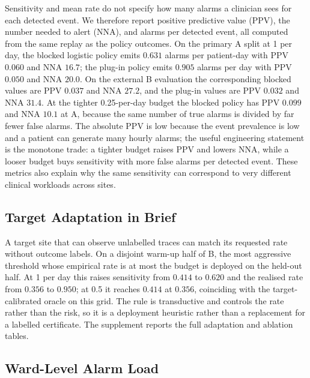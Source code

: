 Sensitivity and mean rate do not specify how many alarms a clinician sees for each detected event. We therefore report positive predictive value (PPV), the number needed to alert (NNA), and alarms per detected event, all computed from the same replay as the policy outcomes. On the primary A split at 1 per day, the blocked logistic policy emits $0.631$ alarms per patient-day with PPV $0.060$ and NNA $16.7$; the plug-in policy emits $0.905$ alarms per day with PPV $0.050$ and NNA $20.0$. On the external B evaluation the corresponding blocked values are PPV $0.037$ and NNA $27.2$, and the plug-in values are PPV $0.032$ and NNA $31.4$. At the tighter 0.25-per-day budget the blocked policy has PPV $0.099$ and NNA $10.1$ at A, because the same number of true alarms is divided by far fewer false alarms. The absolute PPV is low because the event prevalence is low and a patient can generate many hourly alarms; the useful engineering statement is the monotone trade: a tighter budget raises PPV and lowers NNA, while a looser budget buys sensitivity with more false alarms per detected event. These metrics also explain why the same sensitivity can correspond to very different clinical workloads across sites.

\subsection{Target Adaptation in Brief}
\label{sec:adaptation-summary}

A target site that can observe unlabelled traces can match its requested rate without outcome labels. On a disjoint warm-up half of B, the most aggressive threshold whose empirical rate is at most the budget is deployed on the held-out half. At 1 per day this raises sensitivity from $0.414$ to $0.620$ and the realised rate from $0.356$ to $0.950$; at 0.5 it reaches $0.414$ at $0.356$, coinciding with the target-calibrated oracle on this grid. The rule is transductive and controls the rate rather than the risk, so it is a deployment heuristic rather than a replacement for a labelled certificate. The supplement reports the full adaptation and ablation tables.

\subsection{Ward-Level Alarm Load}
\label{sec:ward}

